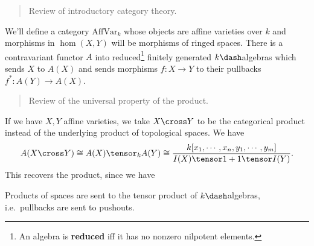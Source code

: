 \begin{quote}
Review of introductory category theory.
\end{quote}

We'll define a category \(\mathrm{AffVar}_k\) whose objects are affine
varieties over \(k\) and morphisms in \(\hom(X, Y)\) will be morphisms
of ringed spaces. There is a contravariant functor \(A\) into
reduced\footnote{An algebra is \textbf{reduced} iff it has no nonzero
  nilpotent elements.} finitely generated \(k\dash\)algebras which sends
\(X\) to \(A(X)\) and sends morphisms \(f:X\to Y\) to their pullbacks
\(f^*:A(Y) \to A(X)\).

\begin{quote}
Review of the universal property of the product.
\end{quote}

\begin{remark}

If we have \(X,Y\) affine varieties, we take \(X\cross Y\) to be the
categorical product instead of the underlying product of topological
spaces. We have
\begin{align*}
A(X\cross Y) \cong A(X) \tensor_k A(Y) \cong \frac{ k[x_1, \cdots, x_n, y_1, \cdots, y_m]} { I(X) \tensor 1 + 1 \tensor I(Y) }
.\end{align*} This recovers the product, since we have

\begin{center}
\end{center}

\end{remark}

\begin{remark}

Products of spaces are sent to the tensor product of \(k\dash\)algebras,
i.e.~pullbacks are sent to pushouts.

\end{remark}

